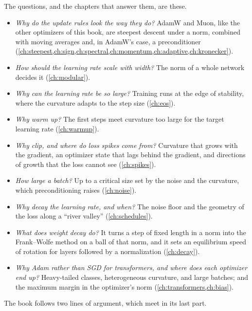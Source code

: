 \begin{refsection}
The questions, and the chapters that answer them, are these.
\begin{itemize}
\item \emph{Why do the update rules look the way they do?} AdamW and Muon, like the other optimizers of this book, are steepest descent under a norm, combined with moving averages and, in AdamW's case, a preconditioner (\cref{ch:steepest,ch:sign,ch:spectral,ch:momentum,ch:adaptive,ch:kronecker}).
\item \emph{How should the learning rate scale with width?} The norm of a whole network decides it (\cref{ch:modular}).
\item \emph{Why can the learning rate be so large?} Training runs at the edge of stability, where the curvature adapts to the step size (\cref{ch:eos}).
\item \emph{Why warm up?} The first steps meet curvature too large for the target learning rate (\cref{ch:warmup}).
\item \emph{Why clip, and where do loss spikes come from?} Curvature that grows with the gradient, an optimizer state that lags behind the gradient, and directions of growth that the loss cannot see (\cref{ch:spikes}).
\item \emph{How large a batch?} Up to a critical size set by the noise and the curvature, which preconditioning raises (\cref{ch:noise}).
\item \emph{Why decay the learning rate, and when?} The noise floor and the geometry of the loss along a ``river valley'' (\cref{ch:schedules}).
\item \emph{What does weight decay do?} It turns a step of fixed length in a norm into the Frank--Wolfe method on a ball of that norm, and it sets an equilibrium speed of rotation for layers followed by a normalization (\cref{ch:decay}).
\item \emph{Why Adam rather than SGD for transformers, and where does each optimizer end up?} Heavy-tailed classes, heterogeneous curvature, and large batches; and the maximum margin in the optimizer's norm (\cref{ch:transformers,ch:bias}).
\end{itemize}


The book follows two lines of argument, which meet in its last part.


\end{refsection}
